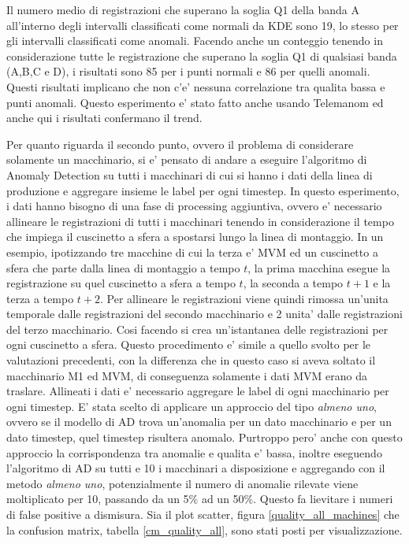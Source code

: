 Il numero medio di registrazioni che superano la soglia Q1 della banda A all'interno degli intervalli classificati come normali da KDE sono 19, lo stesso per gli intervalli classificati come anomali. Facendo anche un conteggio tenendo in considerazione tutte le registrazione che superano la soglia Q1 di qualsiasi banda (A,B,C e D), i risultati sono 85 per i punti normali e 86 per quelli anomali. Questi risultati implicano che non c'e' nessuna correlazione tra qualita bassa e punti anomali. 
Questo esperimento e' stato fatto anche usando Telemanom ed anche qui i risultati confermano il trend.

Per quanto riguarda il secondo punto, ovvero il problema di considerare solamente un macchinario, si e' pensato di andare a eseguire l'algoritmo di Anomaly Detection su tutti i macchinari di cui si hanno i dati della linea di produzione e aggregare insieme le label per ogni timestep.
In questo esperimento, i dati hanno bisogno di una fase di processing aggiuntiva, ovvero e' necessario allineare le registrazioni di tutti i macchinari tenendo in considerazione il tempo che impiega il cuscinetto a sfera a spostarsi lungo la linea di montaggio. In un esempio, ipotizzando tre macchine di cui la terza e' MVM ed un cuscinetto a sfera che parte dalla linea di montaggio a tempo $t$, la prima macchina esegue la registrazione su quel cuscinetto a sfera a tempo $t$, la seconda a tempo $t+1$ e la terza a tempo $t+2$. Per allineare le registrazioni viene quindi rimossa un'unita temporale dalle registrazioni del secondo macchinario e 2 unita' dalle registrazioni del terzo macchinario. Cosi facendo si crea un'istantanea delle registrazioni per ogni cuscinetto a sfera. Questo procedimento e' simile a quello svolto per le valutazioni precedenti, con la differenza che in questo caso si aveva soltato il macchinario M1 ed MVM, di conseguenza solamente i dati MVM erano da traslare.
Allineati i dati e' necessario aggregare le label di ogni macchinario per ogni timestep. E' stata scelto di applicare un approccio del tipo \textit{almeno uno}, ovvero se il modello di AD trova un'anomalia per un dato macchinario e per un dato timestep, quel timestep risultera anomalo. 
Purtroppo pero' anche con questo approccio la corrispondenza tra anomalie e qualita e' bassa, inoltre eseguendo l'algoritmo di AD su tutti e 10 i macchinari a disposizione e aggregando con il metodo \textit{almeno uno}, potenzialmente il numero di anomalie rilevate viene moltiplicato per 10, passando da un 5\% ad un 50\%. Questo fa lievitare i numeri di false positive a dismisura. Sia il plot scatter, figura \ref{quality_all_machines} che la confusion matrix, tabella \ref{cm_quality_all}, sono stati posti per visualizzazione.

